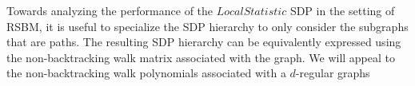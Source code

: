 Towards analyzing the performance of the $LocalStatistic$ SDP in the setting of RSBM, it is useful to specialize the SDP hierarchy to only consider the subgraphs that are paths.  
%
The resulting SDP hierarchy can be equivalently expressed using the non-backtracking walk matrix associated with the graph.
%
We will appeal to the non-backtracking walk polynomials associated with a $d$-regular graphs

